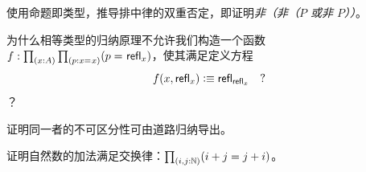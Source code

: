 \begin{ex}\label{ex:not-not-lem}
  使用命题即类型，推导排中律的双重否定，即证明\emph{非（非（$P$ 或非 $P$））}。
\end{ex}

\begin{ex}\label{ex:without-K}
  为什么相等类型的归纳原理不允许我们构造一个函数 $f: \prd{x:A}{p:\id{x}{x}} (\id{p}{\refl{x}})$，使其满足定义方程
  \[ f(x,\mathsf{refl}_{x}) \vcentcolon\equiv \mathsf{refl}_{\mathsf{refl}_{x}} \quad ?\]？
\end{ex}

\begin{ex}\label{ex:subtFromPathInd}
  证明同一者的不可区分性可由道路归纳导出。  
\end{ex}

\begin{ex}\label{ex:add-nat-commutative}
  证明自然数的加法满足交换律：$\prd{i,j:\nat} (i+j=j+i)$。
\end{ex}


